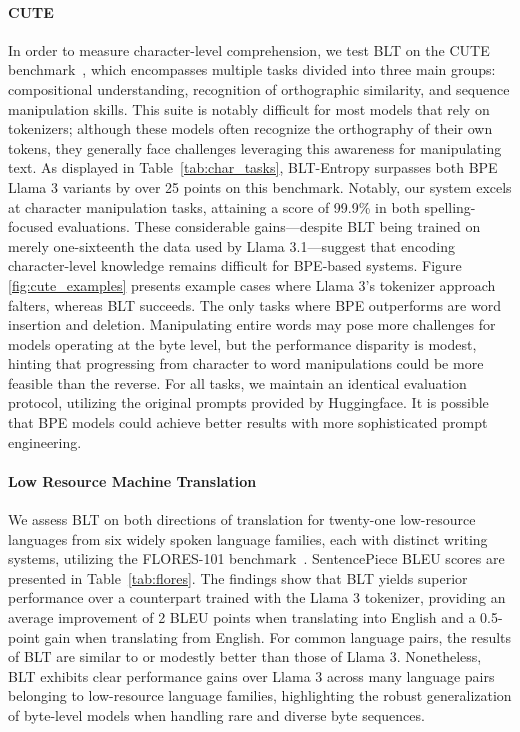 \paragraph{CUTE}
In order to measure character-level comprehension, we test {\textsc BLT} on the CUTE benchmark~\citep{edman2024cute}, which encompasses multiple tasks divided into three main groups: compositional understanding, recognition of orthographic similarity, and sequence manipulation skills. This suite is notably difficult for most models that rely on tokenizers; although these models often recognize the orthography of their own tokens, they generally face challenges leveraging this awareness for manipulating text. As displayed in Table~\ref{tab:char_tasks}, {\textsc BLT}-Entropy surpasses both BPE Llama 3 variants by over 25 points on this benchmark. Notably, our system excels at character manipulation tasks, attaining a score of 99.9\% in both spelling-focused evaluations. These considerable gains—despite {\textsc BLT} being trained on merely one-sixteenth the data used by Llama 3.1—suggest that encoding character-level knowledge remains difficult for BPE-based systems. Figure \ref{fig:cute_examples} presents example cases where Llama 3's tokenizer approach falters, whereas {\textsc BLT} succeeds. The only tasks where BPE outperforms are word insertion and deletion. Manipulating entire words may pose more challenges for models operating at the byte level, but the performance disparity is modest, hinting that progressing from character to word manipulations could be more feasible than the reverse. For all tasks, we maintain an identical evaluation protocol, utilizing the original prompts provided by Huggingface. It is possible that BPE models could achieve better results with more sophisticated prompt engineering.

\paragraph{Low Resource Machine Translation} We assess {\textsc BLT} on both directions of translation for twenty-one low-resource languages from six widely spoken language families, each with distinct writing systems, utilizing the FLORES-101 benchmark~\citep{goyal2022flores}. SentencePiece BLEU scores are presented in Table~\ref{tab:flores}. The findings show that {\textsc BLT} yields superior performance over a counterpart trained with the Llama 3 tokenizer, providing an average improvement of 2 BLEU points when translating into English and a 0.5-point gain when translating from English. For common language pairs, the results of {\textsc BLT} are similar to or modestly better than those of Llama 3. Nonetheless, {\textsc BLT} exhibits clear performance gains over Llama 3 across many language pairs belonging to low-resource language families, highlighting the robust generalization of byte-level models when handling rare and diverse byte sequences.

